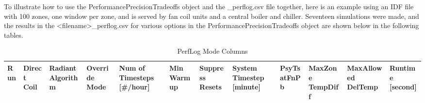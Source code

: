 To illustrate how to use the PerformancePrecisionTradeoffs object and the \_perflog.csv file together, here is an example using an IDF file with 100 zones, one window per zone, and is served by fan coil units and a central boiler and chiller. Seventeen simulations were made, and the results in the <filename>\_perflog.csv for various options in the PerformancePrecisionTradeoffs object are shown below in the following tables.


        {\scriptsize
\begin{longtable}[c]{p{0.15in}p{0.4in}p{0.55in}p{0.5in}p{0.52in}p{0.4in}p{0.5in}p{0.5in}p{0.55in}p{0.5in}p{0.55in}p{0.5in}}
    \caption{PerfLog Mode Columns\label{table:perflog_mode_columns}} \tabularnewline
    \toprule
    Run &
    Direct Coil &
    Radiant Algorithm &
    Override Mode &
    Num of Timesteps {[}\#/hour{]}&
    Min Warmup&
    Suppress Resets &
    System Timestep {[}minute{]} &
    PsyTsatFnPb &
    MaxZone TempDiff &
    MaxAllowed DelTemp &
    Runtime {[}second{]} \tabularnewline
    \midrule
    \endfirsthead


\end{longtable}}
